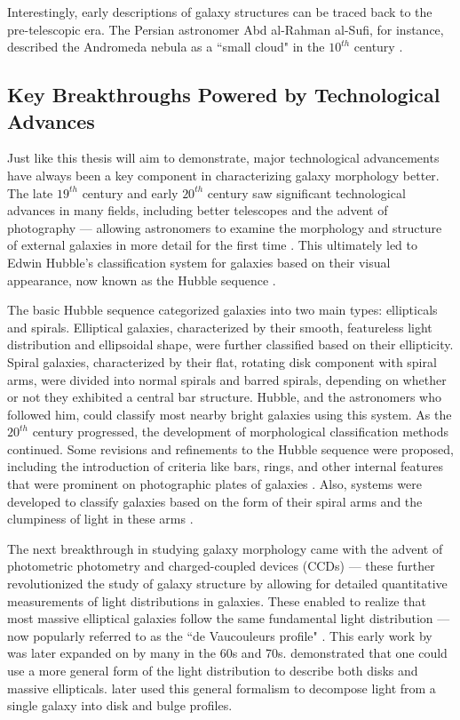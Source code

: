 Interestingly, early descriptions of galaxy structures can be traced back to the pre-telescopic era. The Persian astronomer Abd al-Rahman al-Sufi, for instance, described the Andromeda nebula as a ``small cloud" in the $10^{th}$ century \citep{kepple_98}. 


\subsection{Key Breakthroughs Powered by Technological Advances} \label{sec_intro:technology}

Just like this thesis will aim to demonstrate, major technological advancements have always been a key component in characterizing galaxy morphology better. The late $19^{th}$ century and early $20^{th}$ century saw significant technological advances in many fields, including better telescopes and the advent of photography ---  allowing astronomers to examine the morphology and structure of external galaxies in more detail for the first time \citep[e.g.,][]{wolf_08,lundmark_26}. This ultimately led to Edwin Hubble's classification system for galaxies based on their visual appearance, now known as the Hubble sequence \citep{hubble_1926}. 

The basic Hubble sequence categorized galaxies into two main types: ellipticals and spirals.  Elliptical galaxies, characterized by their smooth, featureless light distribution and ellipsoidal shape, were further classified based on their ellipticity. Spiral galaxies, characterized by their flat, rotating disk component with spiral arms, were divided into normal spirals and barred spirals, depending on whether or not they exhibited a central bar structure. Hubble, and the astronomers who followed him, could classify most nearby bright galaxies using this system. As the $20^{th}$ century progressed, the development of morphological classification methods continued. Some revisions and refinements to the Hubble sequence were proposed, including the introduction of criteria like bars, rings, and other internal features that were prominent on photographic plates of galaxies \citep[e.g.,][]{devac_59}. Also, systems were developed to classify galaxies based on the form of their spiral arms and the clumpiness of light in these arms \citep[e.g.,][]{vbg_60,vbg_76,elmgreen_87}.

The next breakthrough in studying galaxy morphology came with the advent of photometric photometry and charged-coupled devices (CCDs) --- these further revolutionized the study of galaxy structure by allowing for detailed quantitative measurements of light distributions in galaxies. These enabled \citeauthor{de_vac_48} to realize that most massive elliptical galaxies follow the same fundamental light distribution --- now popularly referred to as the ``de Vaucouleurs profile" \citep{de_vac_48}. This early work by \citeauthor{de_vac_48} was later expanded on by many in the 60s and 70s. \citet{sersic_63} demonstrated that one could use a more general form of the light distribution to describe both disks and massive ellipticals. \citet{kormendy_77} later used this general formalism to decompose light from a single galaxy into disk and bulge profiles. 

